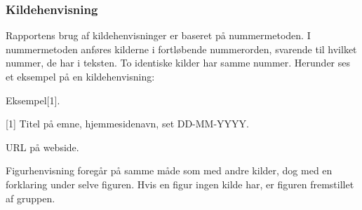 \subsubsection{Kildehenvisning}
Rapportens brug af kildehenvisninger er baseret på nummermetoden. I nummermetoden anføres kilderne i fortløbende nummerorden, svarende til hvilket nummer, de har i teksten. To identiske kilder har samme nummer. Herunder ses et eksempel på en kildehenvisning:

Eksempel[1].

[1] Titel på emne, hjemmesidenavn, set DD-MM-YYYY.

  URL på webside.

Figurhenvisning foregår på samme måde som med andre kilder, dog med en forklaring under selve figuren. Hvis en figur ingen kilde har, er figuren fremstillet af gruppen.
